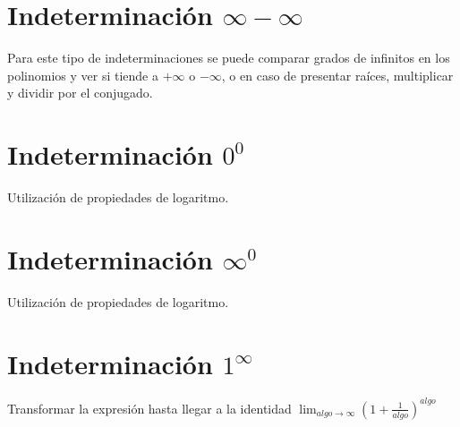 \documentclass[12pt, a4paper]{article}
\begin{document}
\section{Indeterminación $\displaystyle \infty - \infty$}
Para este tipo de indeterminaciones se puede comparar grados de infinitos en los polinomios y ver si tiende a $+\infty$ o $-\infty$, o en caso de presentar raíces, multiplicar y dividir por el conjugado.

\section{Indeterminación $\displaystyle 0^0$}
Utilización de propiedades de logaritmo.

\section{Indeterminación $\displaystyle \infty^0$}
Utilización de propiedades de logaritmo.

\section{Indeterminación $\displaystyle 1^\infty$} 
Transformar la expresión hasta llegar a la identidad $\displaystyle \lim_{algo\to\infty}\left(1+\frac{1}{algo}\right)^{algo}$
\end{document}
